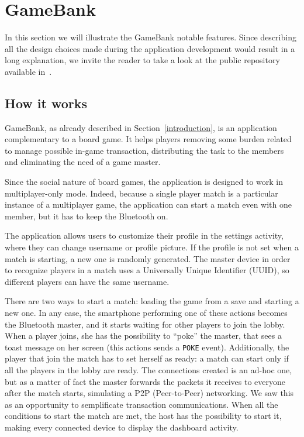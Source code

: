 \section{GameBank}
\label{game_bank}

In this section we will illustrate the GameBank notable features. Since 
describing all the design choices made during the application development would 
result in a long explanation, we invite the reader to take a look at the public 
repository available in~\cite{gamebank18}.

\subsection{How it works}

GameBank, as already described in Section~\ref{introduction}, is an application 
complementary to a board game. It helps players removing some burden related to 
manage possible in-game transaction, distributing the task to the members and 
eliminating the need of a game master.

Since the social nature of board games, the application is designed to work 
in multiplayer-only mode. Indeed, because a single player match is a particular 
instance of a multiplayer game, the application can start a match even with one 
member, but it has to keep the Bluetooth on.

The application allows users to customize their profile in the settings 
activity, where they can change username or profile picture. If the profile is 
not set when a match is starting, a new one is randomly generated. The master 
device in order to recognize players in a match uses a Universally Unique 
Identifier (UUID), so different players can have the same username.

There are two ways to start a match: loading the game from a save and starting 
a new one. In any case, the smartphone performing one of these actions becomes 
the Bluetooth master, and it starts waiting for other players to join the 
lobby. When a player joins, she has the possibility to ``poke'' the master, 
that sees a toast message on her screen (this actions sends a \texttt{POKE} 
event). Additionally, the player that join the match has to set herself as 
ready: a match can start only if all the players in the lobby are ready. 
The connections created is an ad-hoc one, but as a matter of fact the master 
forwards the packets it receives to everyone after the match starts, simulating 
a P2P (Peer-to-Peer) networking. We saw this as an opportunity to semplificate 
transaction communications.
When all the conditions to start the match are met, the host has the 
possibility to start it, making every connected device to display the dashboard 
activity.

